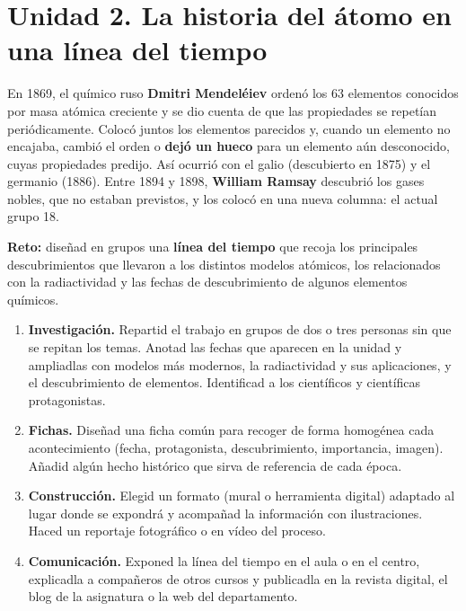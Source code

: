 \section{Unidad 2. La historia del átomo en una línea del tiempo}

En 1869, el químico ruso \textbf{Dmitri Mendeléiev} ordenó los 63 elementos conocidos por masa atómica creciente y se dio cuenta de que las propiedades se repetían periódicamente. Colocó juntos los elementos parecidos y, cuando un elemento no encajaba, cambió el orden o \textbf{dejó un hueco} para un elemento aún desconocido, cuyas propiedades predijo. Así ocurrió con el galio (descubierto en 1875) y el germanio (1886). Entre 1894 y 1898, \textbf{William Ramsay} descubrió los gases nobles, que no estaban previstos, y los colocó en una nueva columna: el actual grupo 18.

\begin{marker}
    \textbf{Reto:} diseñad en grupos una \textbf{línea del tiempo} que recoja los principales descubrimientos que llevaron a los distintos modelos atómicos, los relacionados con la radiactividad y las fechas de descubrimiento de algunos elementos químicos.
\end{marker}

\begin{enumerate}[label=\numberballred]
    \item \textbf{Investigación.} Repartid el trabajo en grupos de dos o tres personas sin que se repitan los temas. Anotad las fechas que aparecen en la unidad y ampliadlas con modelos más modernos, la radiactividad y sus aplicaciones, y el descubrimiento de elementos. Identificad a los científicos y científicas protagonistas.
    \item \textbf{Fichas.} Diseñad una ficha común para recoger de forma homogénea cada acontecimiento (fecha, protagonista, descubrimiento, importancia, imagen). Añadid algún hecho histórico que sirva de referencia de cada época.
    \item \textbf{Construcción.} Elegid un formato (mural o herramienta digital) adaptado al lugar donde se expondrá y acompañad la información con ilustraciones. Haced un reportaje fotográfico o en vídeo del proceso.
    \item \textbf{Comunicación.} Exponed la línea del tiempo en el aula o en el centro, explicadla a compañeros de otros cursos y publicadla en la revista digital, el blog de la asignatura o la web del departamento.
\end{enumerate}

